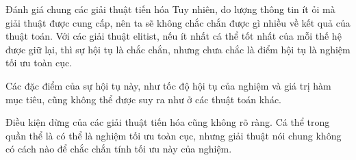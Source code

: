 \begin{frame}{Đánh giá chung các giải thuật tiến hóa}
  Tuy nhiên, do lượng thông tin ít ỏi mà giải thuật được cung cấp, nên ta sẽ
  không chắc chắn được gì nhiều về kết quả của thuật toán. Với các giải thuật
  elitist, nếu ít nhất cá thể tốt nhất của mỗi thế hệ được giữ lại, thì sự hội
  tụ là chắc chắn, nhưng chưa chắc là điểm hội tụ là nghiệm tối ưu toàn cục.

  Các đặc điểm của sự hội tụ này, như tốc độ hội tụ của nghiệm và giá trị hàm
  mục tiêu, cũng không thể được suy ra như ở các thuật toán khác.

  Điều kiện dừng của các giải thuật tiến hóa cũng không rõ ràng. Cá thể trong
  quần thể là có thể là nghiệm tối ưu toàn cục, nhưng giải thuật nói chung không
  có cách nào để chắc chắn tính tối ưu này của nghiệm.
\end{frame}



